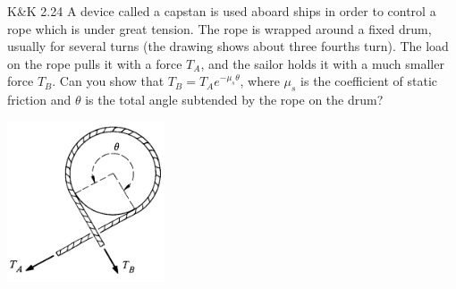 \documentclass{esg8012pset}
\date{September 24}
\begin{document}

\begin{problem}{K\&K 2.24}
  A device called a capstan is used aboard ships in order to control a rope which is under great tension. The rope is wrapped around a fixed drum, usually for several turns (the drawing shows about three fourths turn). The load on the rope pulls it with a force $T_A$, and the sailor holds it with a much smaller force $T_B$.  Can you show that $T_B = T_Ae^{-\mu_s\theta}$, where $\mu_s$ is the coefficient of static friction and $\theta$ is the total angle subtended by the rope on the drum?
  \begin{center}\includegraphics[width=0.35\textwidth]{ps03_1}\end{center}
\end{problem}
\end{document}
